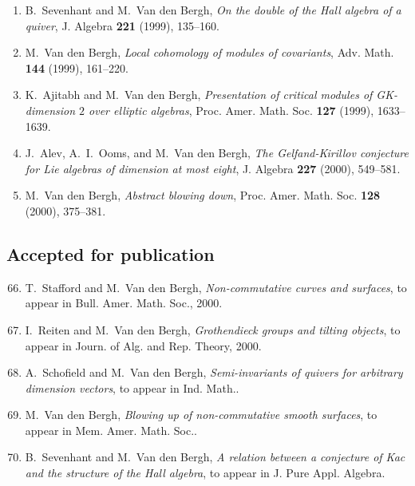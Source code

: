 \begin{enumerate}
\item
B.~Sevenhant and M.~Van den Bergh, {\em On the double of the Hall algebra of a quiver}, J. Algebra {\bf 221} (1999), 135--160.

\item
M.~Van den Bergh, {\em Local cohomology of modules of covariants}, Adv. Math. {\bf 144} (1999), 161--220.

\item
K.~Ajitabh and M.~Van den Bergh, {\em Presentation of critical modules of GK-dimension $2$ over elliptic algebras}, Proc. Amer. Math. Soc. {\bf 127} (1999), 1633--1639.

\item
J.~Alev, A.~I.~Ooms, and M.~Van den Bergh, {\em The Gelfand-Kirillov conjecture for Lie algebras of dimension at most eight}, J. Algebra {\bf 227} (2000), 549--581.

\item
M.~Van den Bergh, {\em Abstract blowing down}, Proc. Amer. Math. Soc. {\bf 128} (2000), 375--381.

\end{enumerate}


\subsection*{Accepted for publication}

\begin{enumerate}
\setcounter{enumi}{65}
\item
T.~Stafford and M.~Van den Bergh, {\em Non-commutative curves and surfaces}, to appear in Bull. Amer. Math. Soc., 2000.

\item
I.~Reiten and M.~Van den Bergh, {\em Grothendieck groups and tilting objects}, to appear in Journ. of Alg. and Rep. Theory, 2000.

\item
A.~Schofield and M.~Van den Bergh, {\em Semi-invariants of quivers for arbitrary dimension vectors}, to appear in Ind. Math..

\item
M.~Van den Bergh, {\em Blowing up of non-commutative smooth surfaces}, to appear in Mem. Amer. Math. Soc..

\item
B.~Sevenhant and M.~Van den Bergh, {\em A relation between a conjecture of Kac and the structure of the Hall algebra}, to appear in J. Pure Appl. Algebra.

\end{enumerate}


